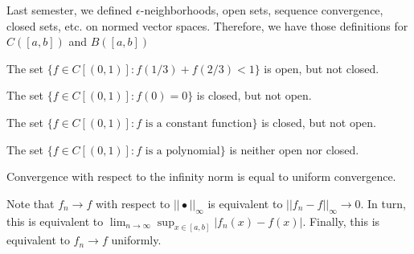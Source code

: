 
Last semester, we defined \(\epsilon\)-neighborhoods, open sets, sequence convergence, closed sets, etc. on normed vector spaces. Therefore, we have those definitions for \(C([a, b])\) and \(B([a, b])\) 

\begin{exmp}{}{}
  The set \(\{f \in C[(0, 1)] : f(1/3) + f(2/3) < 1\}\) is open, but not closed.

  The set \(\{f \in C[(0, 1)] : f(0) = 0\}\) is closed, but not open.

  The set \(\{f \in C[(0, 1)] : f \text{ is a constant function}\}\) is closed, but not open.

  The set \(\{f \in C[(0, 1)] : f \text{ is a polynomial}\}\) is neither open nor closed.
\end{exmp}

\begin{prop}{}{}
  Convergence with respect to the infinity norm is equal to uniform convergence.
\end{prop}
\begin{dem}{}{}
  Note that \(f_n \to f\) with respect to \(||\bullet||_\infty\) is equivalent to \(||f_n - f||_\infty \to 0\). In turn, this is equivalent to \(\lim_{n\to\infty}\sup_{x \in [a, b]} |f_n(x) - f(x)|\). Finally, this is equivalent to  \(f_n \to f\) uniformly.
\end{dem}
